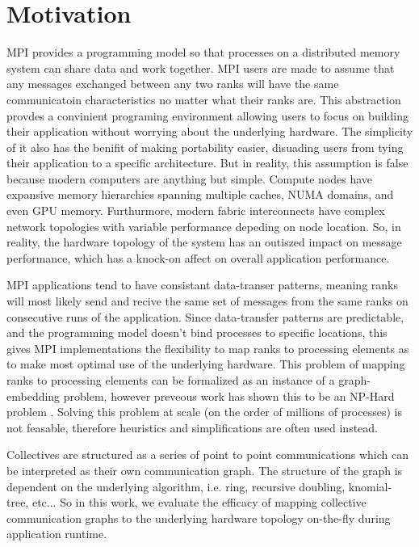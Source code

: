 \section{Motivation}
MPI provides a programming model so that processes on a distributed memory system can share data and work together.
MPI users are made to assume that any messages exchanged between any two ranks will have the same communicatoin characteristics no matter what their ranks are. 
This abstraction provdes a convinient programing environment allowing users to focus on building their application without worrying about the underlying hardware. 
The simplicity of it also has the benifit of making portability easier, disuading users from tying their application to a specific architecture.
But in reality, this assumption is false because modern computers are anything but simple. 
Compute nodes have expansive memory hierarchies spanning multiple caches, NUMA domains, and even GPU memory.
Furthurmore, modern fabric interconnects have complex network topologies with variable performance depeding on node location.
So, in reality, the hardware topology of the system has an outiszed impact on message performance, which has a knock-on affect on overall application performance. 

MPI applications tend to have consistant data-transer patterns, meaning ranks will most likely send and recive the same set of messages from the same ranks on consecutive runs of the application.
Since data-transfer patterns are predictable, and the programming model doesn't bind processes to specific locations, this gives MPI implementations the flexibility to map ranks to processing elements as to make most optimal use of the underlying hardware.
This problem of mapping ranks to processing elements can be formalized as an instance of a graph-embedding problem, however preveous work has shown this to be an NP-Hard problem \cite{Hoefler2011GenericTopoMappingStrats}. 
Solving this problem at scale (on the order of millions of processes) is not feasable, therefore heuristics and simplifications are often used instead.

Collectives are structured as a series of point to point communications which can be interpreted as their own communication graph.
The structure of the graph is dependent on the underlying algorithm, i.e. ring, recursive doubling, knomial-tree, etc...
So in this work, we evaluate the efficacy of mapping collective communication graphs to the underlying hardware topology on-the-fly during application runtime.


